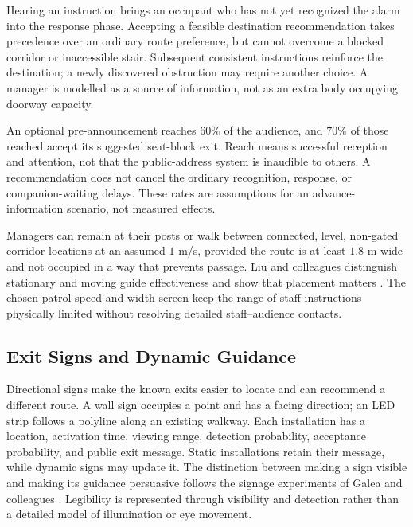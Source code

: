 \documentclass[11pt,a4paper]{article}
\begin{document}
Hearing an instruction brings an occupant who has not yet recognized the alarm into the response phase. Accepting a feasible destination recommendation takes precedence over an ordinary route preference, but cannot overcome a blocked corridor or inaccessible stair. Subsequent consistent instructions reinforce the destination; a newly discovered obstruction may require another choice. A manager is modelled as a source of information, not as an extra body occupying doorway capacity.

An optional pre-announcement reaches $60\%$ of the audience, and $70\%$ of those reached accept its suggested seat-block exit. Reach means successful reception and attention, not that the public-address system is inaudible to others. A recommendation does not cancel the ordinary recognition, response, or companion-waiting delays. These rates are assumptions for an advance-information scenario, not measured effects.

Managers can remain at their posts or walk between connected, level, non-gated corridor locations at an assumed $1$ m/s, provided the route is at least $1.8$ m wide and not occupied in a way that prevents passage. Liu and colleagues distinguish stationary and moving guide effectiveness and show that placement matters \cite{liu}. The chosen patrol speed and width screen keep the range of staff instructions physically limited without resolving detailed staff--audience contacts.

\subsection{Exit Signs and Dynamic Guidance}

Directional signs make the known exits easier to locate and can recommend a different route. A wall sign occupies a point and has a facing direction; an LED strip follows a polyline along an existing walkway. Each installation has a location, activation time, viewing range, detection probability, acceptance probability, and public exit message. Static installations retain their message, while dynamic signs may update it. The distinction between making a sign visible and making its guidance persuasive follows the signage experiments of Galea and colleagues \cite{galea2014}. Legibility is represented through visibility and detection rather than a detailed model of illumination or eye movement.
\end{document}
